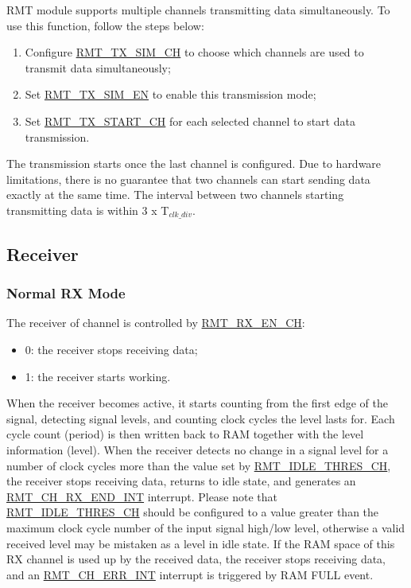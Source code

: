 \documentclass[main\_\_EN.tex]{subfiles}
\begin{document}
RMT module supports multiple channels transmitting data simultaneously. To use this function, follow the steps below:

\begin{enumerate}
    \item Configure \hyperref[regdesc:RMTTXSIMREG]{RMT\_TX\_SIM\_CH} to choose which channels are used to transmit data simultaneously;
    \item Set \hyperref[fielddesc:RMTTXSIMEN]{RMT\_TX\_SIM\_EN} to enable this transmission mode;
    \item Set \hyperref[fielddesc:RMTTXSTARTCHN]{RMT\_TX\_START\_CH} for each selected channel to start data transmission.
\end{enumerate}

The transmission starts once the last channel is configured. Due to hardware limitations, there is no guarantee that two channels can start sending data exactly at the same time. The interval between two channels starting transmitting data is within 3 x T$_{clk\_div}$.


\subsection{Receiver}

\subsubsection{Normal RX Mode}\label{sec:normal-rx-mode}

The receiver of channel  is controlled by \hyperref[fielddesc:RMTRXENCHM]{RMT\_RX\_EN\_CH}: 
\begin{itemize}
    \item 0: the receiver stops receiving data;
    \item 1: the receiver starts working.
\end{itemize}

When the receiver becomes active, it starts counting from the first edge of the signal, detecting signal levels, and counting clock cycles the level lasts for. Each cycle count (period) is then written back to RAM together with the level information (level). When the receiver detects no change in a signal level for a number of clock cycles more than the value set by \hyperref[fielddesc:RMTIDLETHRESCHM]{RMT\_IDLE\_THRES\_CH}, the receiver stops receiving data, returns to idle state, and generates an \hyperref[int:RMTCHnRXENDINT]{RMT\_CH\_RX\_END\_INT} interrupt. Please note that \hyperref[fielddesc:RMTIDLETHRESCHM]{RMT\_IDLE\_THRES\_CH} should be configured to a value greater than the maximum clock cycle number of the input signal high/low level, otherwise a valid received level may be mistaken as a level in idle state. If the RAM space of this RX channel is used up by the received data, the receiver stops receiving data, and an \hyperref[int:RMTCHnERRINT]{RMT\_CH\_ERR\_INT} interrupt is triggered by RAM FULL event.
\end{document}
